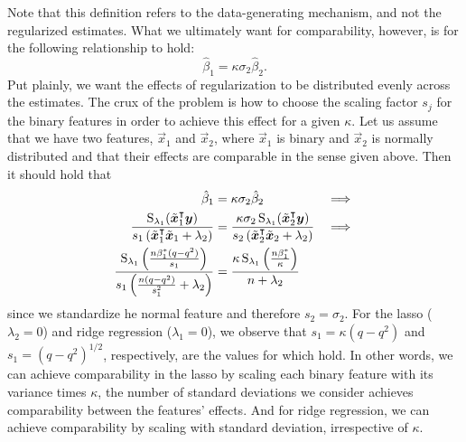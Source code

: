 Note that this definition refers to the data-generating mechanism, and not the regularized
estimates. What we ultimately want for comparability, however, is for the following
relationship to hold:
\[
  \hat{\beta}_1 = \kappa \sigma_{2}\hat{\beta}_2.
\]
Put plainly, we want the effects of regularization to be distributed evenly across the
estimates. The crux of the problem is how to choose the scaling factor \(s_j\) for the
binary features in order to achieve this effect for a given \(\kappa\). Let us assume that
we have two features, \(\vec{x}_1\) and \(\vec{x}_2\), where \(\vec{x}_1\) is binary and
\(\vec{x}_2\) is normally distributed and that their effects are comparable in the sense
given above. Then it should hold that
%
\begin{alignat}{3}
  \label{eq:comparable-effects}
  \hat{\beta}_1                                                                                                                          & = \kappa \sigma_2\hat{\beta}_2                                                                                                                           & \implies \nonumber \\
  \frac{\operatorname{S}_{\lambda_1}(\tilde{\boldsymbol{x}}_1^\intercal \boldsymbol{y})}{s_1\left(\tilde{\boldsymbol{x}}_1^\intercal \tilde{\boldsymbol{x}}_1 + \lambda_2\right)} & = \frac{\kappa \sigma_2 \operatorname{S}_{\lambda_1}(\tilde{\boldsymbol{x}}_2^\intercal \boldsymbol{y})}{s_2\left(\tilde{\boldsymbol{x}}_2^\intercal \tilde{\boldsymbol{x}}_2 + \lambda_2\right)} & \implies \nonumber \\
  \frac{\operatorname{S}_{\lambda_1}\left(\frac{n\beta_1^* (q - q^2)}{s_1}\right)}{s_1\left(\frac{n(q - q^2)}{s_1^2} + \lambda_2\right)}              & = \frac{\kappa \operatorname{S}_{\lambda_1}\left(\frac{n\beta_1^*}{\kappa} \right)}{n + \lambda_2}
\end{alignat}
%
since we standardize he normal feature and therefore \(s_2 = \sigma_2\).
For the lasso (\(\lambda_2 = 0\)) and ridge regression (\(\lambda_1=0\)), we observe that
\(s_1 = \kappa (q - q^2)\) and \(s_1 = (q - q^2)^{1/2}\), respectively, are the values for
which  hold. In other words, we can achieve comparability in
the lasso by scaling each binary feature with its variance times \(\kappa\), the number of
standard deviations we consider achieves comparability between the features' effects. And
for ridge regression, we can achieve comparability by scaling with standard deviation,
irrespective of \(\kappa\).

